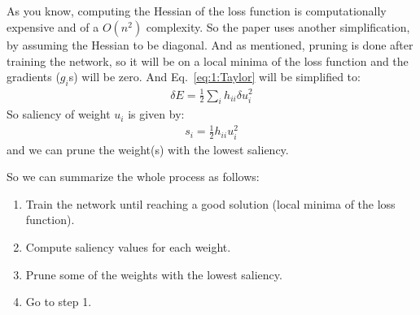 \documentclass[]{article}
\begin{document}
\subsection{}
As you know, computing the Hessian of the loss function is computationally expensive and of a \(O(n^2)\) complexity.
So the paper uses another simplification, by assuming the Hessian to be diagonal.
And as mentioned, pruning is done after training the network, so it will be on a local minima of the loss function and the gradients (\(g_i\)s) will be zero.
And Eq.~\ref{eq:1:Taylor} will be simplified to:
\begin{align}
\delta E = \frac{1}{2} \sum_{i} h_{ii} \delta u_i^2
\end{align}
So saliency of weight \(u_i\) is given by:
\begin{align}
s_i = \frac{1}{2} h_{ii}u_i^2
\end{align}
and we can prune the weight(s) with the lowest saliency.

So we can summarize the whole process as follows:
\begin{enumerate}
    \item Train the network until reaching a good solution (local minima of the loss function).
    \item Compute saliency values for each weight.
    \item Prune some of the weights with the lowest saliency.
    \item Go to step 1.
\end{enumerate} 
\end{document}
